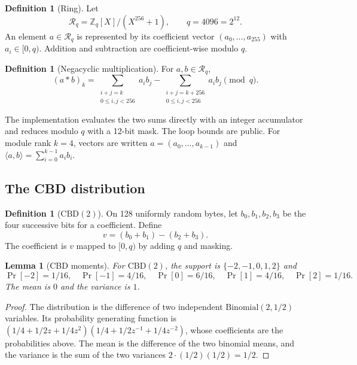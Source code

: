 \documentclass[11pt,a4paper]{article}
\theoremstyle{plain}
\newtheorem{lemma}[theorem]{Lemma}
\theoremstyle{definition}
\newtheorem{definition}[theorem]{Definition}
\theoremstyle{remark}
\newcommand{\Z}{\mathbb{Z}}
\newcommand{\Ring}{\mathcal{R}_q}
\newcommand{\CBD}{\mathrm{CBD}}
\begin{document}
\begin{definition}[Ring]
Let
\[
  \Ring=\Z_q[X]/(X^{256}+1), \qquad q=4096=2^{12}.
\]
An element $a\in\Ring$ is represented by its coefficient vector
$(a_0,\ldots,a_{255})$ with $a_i\in[0,q)$.  Addition and subtraction
are coefficient-wise modulo $q$.
\end{definition}

\begin{definition}[Negacyclic multiplication]
For $a,b\in\Ring$,
\[
 (a*b)_k=\sum_{\substack{i+j=k\\0\le i,j<256}}a_i b_j
        -\sum_{\substack{i+j=k+256\\0\le i,j<256}}a_i b_j
 \pmod q.
\]
\end{definition}

The implementation evaluates the two sums directly with an integer
accumulator and reduces modulo $q$ with a 12-bit mask.  The loop bounds
are public.  For module rank $k=4$, vectors are written
$a=(a_0,\ldots,a_{k-1})$ and
$\langle a,b\rangle=\sum_{i=0}^{k-1}a_i b_i$.

\subsection{The CBD distribution}

\begin{definition}[$\CBD(2)$]
On 128 uniformly random bytes, let $b_0,b_1,b_2,b_3$ be the four
successive bits for a coefficient.  Define
\[
 v=(b_0+b_1)-(b_2+b_3).
\]
The coefficient is $v$ mapped to $[0,q)$ by adding $q$ and masking.
\end{definition}

\begin{lemma}[CBD moments]
\label{lem:cbd}
For $\CBD(2)$, the support is $\{-2,-1,0,1,2\}$ and
\[
 \Pr[-2]=1/16,\quad \Pr[-1]=4/16,\quad \Pr[0]=6/16,\quad
 \Pr[1]=4/16,\quad \Pr[2]=1/16.
\]
The mean is $0$ and the variance is $1$.
\end{lemma}

\begin{proof}
The distribution is the difference of two independent
$\mathrm{Binomial}(2,1/2)$ variables.  Its probability generating
function is $(1/4+1/2z+1/4z^2)(1/4+1/2z^{-1}+1/4z^{-2})$, whose
coefficients are the probabilities above.  The mean is the difference of
the two binomial means, and the variance is the sum of the two
variances $2\cdot(1/2)(1/2)=1/2$.
\end{proof}

\end{document}
